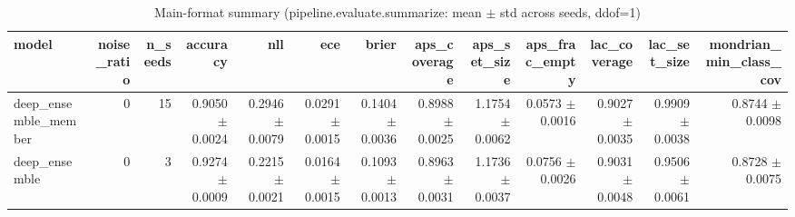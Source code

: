 \begin{table}
\centering
\caption{Main-format summary (pipeline.evaluate.summarize: mean $\pm$ std across seeds, ddof=1)}
\label{tab:de_main_format_summary}
\begin{tabular}{lrrrrrrrrrrrr}
\toprule
               model &  noise\_ratio &  n\_seeds &        accuracy &             nll &             ece &           brier &    aps\_coverage &    aps\_set\_size &  aps\_frac\_empty &    lac\_coverage &    lac\_set\_size & mondrian\_min\_class\_cov \\
\midrule
deep\_ensemble\_member &            0 &       15 & 0.9050 $\pm$ 0.0024 & 0.2946 $\pm$ 0.0079 & 0.0291 $\pm$ 0.0015 & 0.1404 $\pm$ 0.0036 & 0.8988 $\pm$ 0.0025 & 1.1754 $\pm$ 0.0062 & 0.0573 $\pm$ 0.0016 & 0.9027 $\pm$ 0.0035 & 0.9909 $\pm$ 0.0038 &        0.8744 $\pm$ 0.0098 \\
       deep\_ensemble &            0 &        3 & 0.9274 $\pm$ 0.0009 & 0.2215 $\pm$ 0.0021 & 0.0164 $\pm$ 0.0015 & 0.1093 $\pm$ 0.0013 & 0.8963 $\pm$ 0.0031 & 1.1736 $\pm$ 0.0037 & 0.0756 $\pm$ 0.0026 & 0.9031 $\pm$ 0.0048 & 0.9506 $\pm$ 0.0061 &        0.8728 $\pm$ 0.0075 \\
\bottomrule
\end{tabular}
\end{table}
